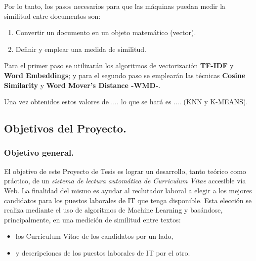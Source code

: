 \documentclass[12pt,a4paper]{article}
\begin{document}
Por lo tanto, los pasos necesarios para que las máquinas puedan medir la similitud entre documentos son:
\begin{enumerate}
\item Convertir un documento en un objeto matemático (vector).
\item Definir y emplear una medida de similitud.
\end{enumerate}

Para el primer paso se utilizarán los algoritmos de vectorización \textbf{TF-IDF} y \textbf{Word Embeddings}; y para el segundo paso se emplearán las técnicas \textbf{Cosine Similarity} y \textbf{Word Mover's Distance -WMD-}.

Una vez obtenidos estos valores de .... lo que se hará es .... (KNN y K-MEANS).

\cleardoublepage    %

\subsection{Objetivos del Proyecto.}

\subsubsection{Objetivo general.}

El objetivo de este Proyecto de Tesis es lograr un desarrollo, tanto teórico como práctico, de un \textit{sistema de lectura automática de Curriculum Vitae} accesible vía Web. La finalidad del mismo es ayudar al reclutador laboral a elegir a los mejores candidatos para los puestos laborales de IT que tenga disponible. Esta elección se realiza mediante el uso de algoritmos de Machine Learning y basándose, principalmente, en una medición de similitud entre textos:  
\begin{itemize}
\item los Curriculum Vitae de los candidatos por un lado, 
\item y descripciones de los puestos laborales de IT por el otro.
\end{itemize} 
\end{document}
